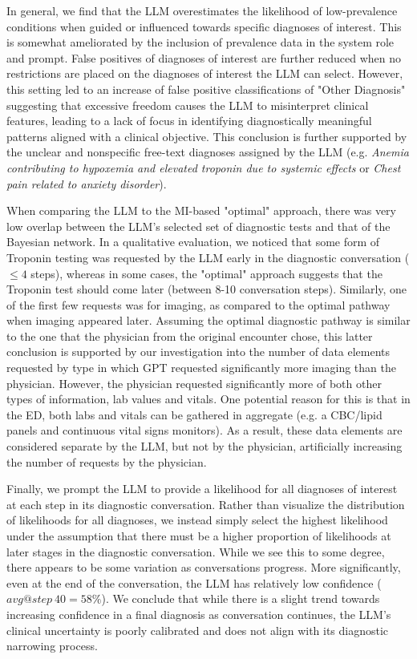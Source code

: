 In general, we find that the LLM overestimates the likelihood of low-prevalence conditions when guided or influenced towards specific diagnoses of interest. This is somewhat ameliorated by the inclusion of prevalence data in the system role and prompt. False positives of diagnoses of interest are further reduced when no restrictions are placed on the diagnoses of interest the LLM can select. However, this setting led to an increase of false positive classifications of "Other Diagnosis" suggesting that excessive freedom causes the LLM to misinterpret clinical features, leading to a lack of focus in identifying diagnostically meaningful patterns aligned with a clinical objective. This conclusion is further supported by the unclear and nonspecific free-text diagnoses assigned by the LLM (e.g. \emph{Anemia contributing to hypoxemia and elevated troponin due to systemic effects} or \emph{Chest pain related to anxiety disorder}). 

When comparing the LLM to the MI-based "optimal" approach, there was very low overlap between the LLM's selected set of diagnostic tests and that of the Bayesian network. In a qualitative evaluation, we noticed that some form of Troponin testing was requested by the LLM early in the diagnostic conversation ($\leq4$ steps), whereas in some cases, the "optimal" approach suggests that the Troponin test should come later (between 8-10 conversation steps). Similarly, one of the first few requests was for imaging, as compared to the optimal pathway when imaging appeared later. Assuming the optimal diagnostic pathway is similar to the one that the physician from the original encounter chose, this latter conclusion is supported by our investigation into the number of data elements requested by type in which GPT requested significantly more imaging than the physician. However, the physician requested significantly more of both other types of information, lab values and vitals. One potential reason for this is that in the ED, both labs and vitals can be gathered in aggregate (e.g. a CBC/lipid panels and continuous vital signs monitors). As a result, these data elements are considered separate by the LLM, but not by the physician, artificially increasing the number of requests by the physician. 

Finally, we prompt the LLM to provide a likelihood for all diagnoses of interest at each step in its diagnostic conversation. Rather than visualize the distribution of likelihoods for all diagnoses, we instead simply select the highest likelihood under the assumption that there must be a higher proportion of likelihoods at later stages in the diagnostic conversation. While we see this to some degree, there appears to be some variation as conversations progress. More significantly, even at the end of the conversation, the LLM has relatively low confidence ($avg@step\ 40 = 58\%$). We conclude that while there is a slight trend towards increasing confidence in a final diagnosis as conversation continues, the LLM's clinical uncertainty is poorly calibrated and does not align with its diagnostic narrowing process. 

